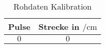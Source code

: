 \begin{table}[H]
    \centering
    \caption{Rohdaten Kalibration}

    \begin{tabular}{| c | c |}
      Pulse & Strecke in $\si{\per \centi \metre}$ \\
                              \hline
                              $ 0 $ & $0$
    \end{tabular}
\end{table}
